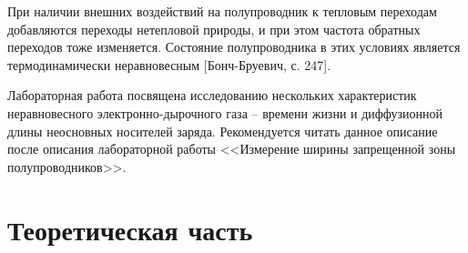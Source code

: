 При наличии внешних воздействий на полупроводник к тепловым переходам добавляются переходы нетепловой природы, и при этом частота обратных переходов тоже изменяется. Состояние полупроводника в этих условиях является термодинамически неравновесным [Бонч-Бруевич, с. 247].

Лабораторная работа посвящена исследованию нескольких характеристик неравновесного электронно-дырочного газа -- времени жизни и диффузионной длины неосновных носителей заряда. Рекомендуется читать данное описание после описания лабораторной работы <<Измерение ширины запрещенной зоны полупроводников>>.

\section{Теоретическая часть}






